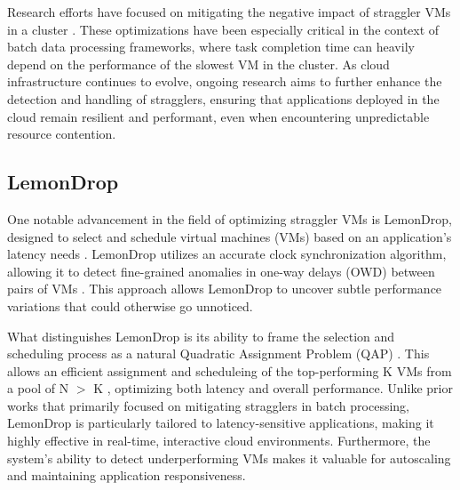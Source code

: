 Research efforts have focused on mitigating the negative impact of 
straggler VMs in a cluster \cite{wrangler, selectingVMS, fasterJI}. 
These optimizations have been especially critical in the context of batch data 
processing frameworks, where task completion time can heavily depend on the 
performance of the slowest VM in the cluster.
As cloud infrastructure continues to evolve, ongoing research aims to 
further enhance the detection and handling of stragglers, ensuring that applications 
deployed in the cloud remain resilient and performant, even when encountering unpredictable resource contention.




\subsection{LemonDrop}
One notable advancement in the field of optimizing straggler VMs is LemonDrop, 
designed to select and schedule virtual machines (VMs) based on an application's latency needs \cite{lemondrop}. 
LemonDrop utilizes an accurate clock synchronization algorithm,  
allowing it to detect fine-grained anomalies in one-way delays (OWD) between pairs of VMs \cite{hyugens}. 
This approach allows LemonDrop to uncover subtle performance variations that could otherwise go unnoticed. 

What distinguishes LemonDrop is its ability to frame the selection and scheduling process as a 
natural Quadratic Assignment Problem (QAP) \cite{QAP}. 
This allows an efficient assignment and scheduleing of the top-performing K VMs from a pool of N $>$ K
, optimizing both latency and overall performance. Unlike prior works that primarily focused on 
mitigating stragglers in batch processing, LemonDrop is particularly tailored to latency-sensitive applications, 
making it highly effective in real-time, interactive cloud environments. 
Furthermore, the system's ability to detect underperforming VMs
makes it valuable for autoscaling and maintaining application responsiveness.




